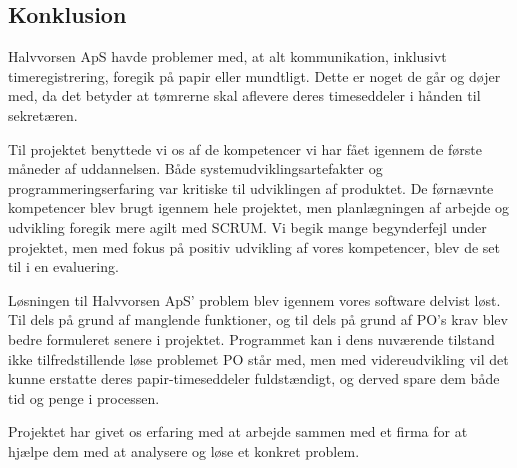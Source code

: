 \subsection{Konklusion}
Halvvorsen ApS havde problemer med, at alt kommunikation, inklusivt timeregistrering, foregik på papir eller mundtligt. 
Dette er noget de går og døjer med, da det betyder at tømrerne skal aflevere deres timeseddeler i hånden til sekretæren.

Til projektet benyttede vi os af de kompetencer vi har fået igennem de første måneder af uddannelsen.
Både systemudviklingsartefakter og programmeringserfaring var kritiske til udviklingen af produktet. 
De førnævnte kompetencer blev brugt igennem hele projektet, men planlægningen af arbejde og udvikling foregik mere agilt med SCRUM.
Vi begik mange begynderfejl under projektet, men med fokus på positiv udvikling af vores kompetencer, blev de set til i en evaluering.
 
Løsningen til Halvvorsen ApS' problem blev igennem vores software delvist løst. 
Til dels på grund af manglende funktioner, og til dels på grund af PO's krav blev bedre formuleret senere i projektet.
Programmet kan i dens nuværende tilstand ikke tilfredstillende løse problemet PO står med, men med videreudvikling vil det kunne erstatte deres papir-timeseddeler fuldstændigt, og derved spare dem både tid og penge i processen.

Projektet har givet os erfaring med at arbejde sammen med et firma for at hjælpe dem med at analysere og løse et konkret problem.